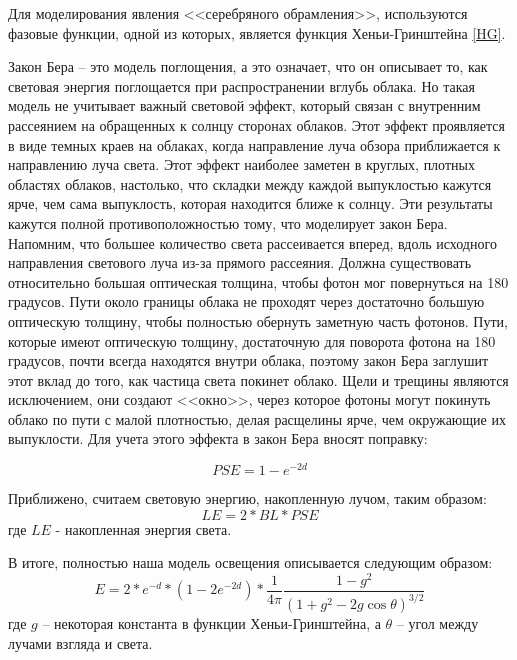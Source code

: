 Для моделирования явления <<серебряного обрамления>>, используются фазовые функции, одной из которых, является функция Хеньи-Гринштейна \eqref{HG}.

Закон Бера -- это модель поглощения, а это означает, что он описывает то, как световая энергия поглощается при распространении вглубь облака. Но такая модель не учитывает важный световой эффект, который связан с внутренним рассеянием на обращенных к солнцу сторонах облаков. Этот эффект проявляется в виде темных краев на облаках, когда направление луча обзора приближается к направлению луча света. Этот эффект наиболее заметен в круглых, плотных областях облаков, настолько, что складки между каждой выпуклостью кажутся ярче, чем сама выпуклость, которая находится ближе к солнцу. Эти результаты кажутся полной противоположностью тому, что моделирует закон Бера.  Напомним, что большее количество света рассеивается вперед, вдоль исходного направления светового луча из-за прямого рассеяния. Должна существовать относительно большая оптическая толщина, чтобы фотон мог повернуться на 180 градусов. Пути около границы облака не проходят через достаточно большую оптическую толщину, чтобы полностью обернуть заметную часть фотонов. Пути, которые имеют оптическую толщину, достаточную для поворота фотона на 180 градусов, почти всегда находятся внутри облака, поэтому закон Бера заглушит этот вклад до того, как частица света покинет облако. Щели и трещины являются исключением, они создают <<окно>>, через которое фотоны могут покинуть облако по пути с малой плотностью, делая расщелины ярче, чем окружающие их выпуклости. Для учета этого эффекта в закон Бера вносят поправку:

\begin{equation}
	\label{sugar_powder}
	PSE = 1 - e ^ {-2 d}
\end{equation}

Приближено, считаем световую энергию, накопленную лучом, таким образом:
\begin{equation}
	\label{bsp}
	LE = 2 * BL * PSE
\end{equation}
где $ LE $ - накопленная энергия света. 

В итоге, полностью наша модель освещения описывается следующим образом:
\begin{equation}
	\label{light_model}
	E = 2 * e ^ {-d} * (1 - 2 e ^ {-2d}) * \frac{1}{4\pi} \frac{1 - g^2}{(1 + g^2 - 2g\cos \theta)^{3/2}}
\end{equation}
где $ g $ -- некоторая константа в функции Хеньи-Гринштейна, а $ \theta $ -- угол между лучами взгляда и света.

